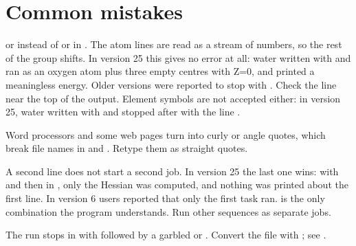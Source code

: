 \documentclass[letterpaper,10pt,english,openany,oneside]{sphinxmanual}
\begin{document}
\section{Common mistakes}
\label{\detokenize{start/input-syntax:common-mistakes}}\begin{description}
\sphinxAtStartPar
{} or  instead of  or  in . The atom lines are read as a stream of numbers, so the
rest of the group shifts. In version 25 this gives no error at all: water written with  and  ran as an
oxygen atom plus three empty centres with Z=0, and printed a meaningless energy. Older versions were reported to
stop with . Check the  line near the top of the output. Element symbols
are not accepted either: in version 25, water written with  and  stopped after  with the
line .



\sphinxAtStartPar
Word processors and some web pages turn  into curly or angle quotes, which break file names in  and
. Retype them as straight quotes.



\sphinxAtStartPar
A second  line does not start a second job. In version 25 the last one wins: with  and then
 in , only the Hessian was computed, and nothing was printed about the first line. In version 6
users reported that only the first task ran.  is the only combination the program
understands. Run other sequences as separate jobs.



\sphinxAtStartPar
The run stops in  with  followed by a garbled  or . Convert the
file with ; see {\hyperref[\detokenize{start/running::doc}]{}}.




\end{description}
\end{document}
